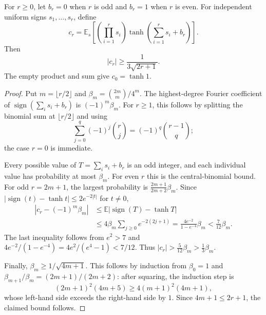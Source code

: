 \begin{lemma}
\label{lem:parity-feature}
For $r\ge0$, let $b_r=0$ when $r$ is odd and $b_r=1$ when $r$ is even.
For independent uniform signs $s_1,\ldots,s_r$, define
\[
 c_r=\mathbb E_s\left[
    \left(\prod_{i=1}^r s_i\right)
    \tanh\left(\sum_{i=1}^r s_i+b_r\right)
 \right].
\]
Then
\begin{equation}\label{eq:parity-correlation}
 |c_r|\ge\frac{1}{3\sqrt{2r+1}}.
\end{equation}
The empty product and sum give $c_0=\tanh 1$.
\end{lemma}
\begin{proof}
Put $m=\lfloor r/2\rfloor$ and
$\beta_m=\binom{2m}{m}/4^m$.  The highest-degree Fourier coefficient of
$\operatorname{sign}(\sum_i s_i+b_r)$ is $(-1)^m\beta_m$.
For $r\ge1$, this follows by splitting the binomial sum at
$\lfloor r/2\rfloor$ and using
\[
 \sum_{j=0}^{q}(-1)^j\binom rj
   =(-1)^q\binom{r-1}{q};
\]
the case $r=0$ is immediate.

Every possible value of $T=\sum_i s_i+b_r$ is an odd integer, and each
individual value has probability at most $\beta_m$.  For even $r$ this
is the central-binomial bound.  For odd $r=2m+1$, the largest probability
is $\frac{2m+1}{2m+2}\beta_m$.  Since
$|\operatorname{sign}(t)-\tanh t|\le2e^{-2|t|}$ for $t\ne0$,
\begin{align*}
 \left|c_r-(-1)^m\beta_m\right|
 &\le\mathbb E\left|
     \operatorname{sign}(T)-\tanh T\right|\\
 &\le4\beta_m\sum_{j\ge0}e^{-2(2j+1)}
   =\frac{4e^{-2}}{1-e^{-4}}\beta_m
   <\frac{7}{12}\beta_m.
\end{align*}
The last inequality follows from $e^2>7$ and
$4e^{-2}/(1-e^{-4})=4e^2/(e^4-1)<7/12$.
Thus $|c_r|>\frac{5}{12}\beta_m>\frac13\beta_m$.

Finally, $\beta_m\ge1/\sqrt{4m+1}$.  This follows by induction from
$\beta_0=1$ and
$\beta_{m+1}/\beta_m=(2m+1)/(2m+2)$: after squaring, the induction step is
\[
 (2m+1)^2(4m+5)\ge4(m+1)^2(4m+1),
\]
whose left-hand side exceeds the right-hand side by $1$.
Since $4m+1\le2r+1$, the claimed bound follows.
\end{proof}

